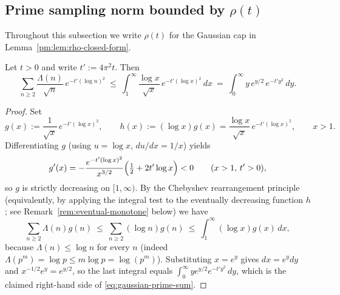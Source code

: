\subsection{Prime sampling norm bounded by \texorpdfstring{$\rho(t)$}{ρ(t)}}

Throughout this subsection we write $\rho(t)$ for the Gaussian cap in Lemma~\ref{pm:lem:rho-closed-form}.

\begin{lemma}\label{pm:lem:sum-to-rho}
Let $t>0$ and write $t' := 4\pi^2 t$. Then
\begin{equation}\label{eq:gaussian-prime-sum}
  \sum_{n\ge 2}\frac{\Lambda(n)}{\sqrt n}\,e^{-t'(\log n)^2}
  \ \le\ 
  \int_{1}^{\infty}\frac{\log x}{\sqrt x}\,e^{-t'(\log x)^2}\,dx
  \ =\ 
  \int_{0}^{\infty} y\,e^{y/2}\,e^{-t' y^2}\,dy.
\end{equation}
\end{lemma}

\begin{proof}
Set
\begin{equation}\label{eq:Prime_norm_leq_rho-formula-9}
  g(x):=\frac{1}{\sqrt{x}}\,e^{-t'(\log x)^2},\qquad
  h(x):=(\log x)g(x)=\frac{\log x}{\sqrt{x}}\,e^{-t'(\log x)^2},\qquad x>1.
\end{equation}
Differentiating $g$ (using $u=\log x$, $du/dx = 1/x$) yields
\begin{equation}\label{eq:Prime_norm_leq_rho-formula-8}
  g'(x) = -\frac{e^{-t'(\log x)^2}}{x^{3/2}}\Bigl(\tfrac12 + 2t'\log x\Bigr) < 0\qquad(x>1,\,t'>0),
\end{equation}
so $g$ is strictly decreasing on $[1,\infty)$. By the Chebyshev rearrangement principle (equivalently, by applying the integral test to the eventually decreasing function $h$; see Remark~\ref{rem:eventual-monotone} below) we have
\begin{equation}\label{eq:Prime_norm_leq_rho-formula-7}
  \sum_{n\ge 2}\Lambda(n) g(n)
  \ \le\ \sum_{n\ge 2}(\log n) g(n)
  \ \le\ \int_{1}^{\infty}(\log x) g(x)\,dx,
\end{equation}
because $\Lambda(n)\le \log n$ for every $n$ (indeed $\Lambda(p^m)=\log p \le m\log p = \log(p^m)$).
Substituting $x=e^{y}$ gives $dx=e^{y}dy$ and $x^{-1/2}e^{y}=e^{y/2}$, so the last integral equals $\int_{0}^{\infty} y e^{y/2} e^{-t' y^2}\,dy$, which is the claimed right-hand side of \eqref{eq:gaussian-prime-sum}.
\end{proof}

